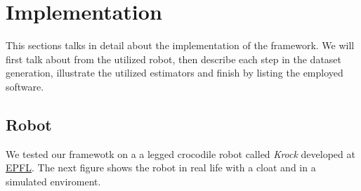 \documentclass[../document.tex]{subfiles}
\begin{document}
\chapter{Implementation}
\label{chap: implementation}
This sections talks in detail about the implementation of the framework. We will first talk about from the utilized robot, then describe each step in the dataset generation, illustrate the utilized estimators and finish by listing the employed software.
\section{Robot}
We tested our framewotk on a a legged crocodile robot called \emph{Krock} developed at \href{https://duckduckgo.com/?q=EPFL&atb=v154-1__&ia=web}{EPFL}. The next figure shows the robot in real life with a cloat and in a simulated enviroment.
\end{document}
